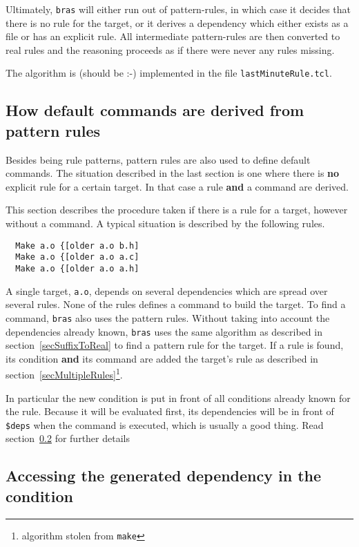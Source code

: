\documentclass[11pt]{scrartcl}
\newcommand{\bras}{\texttt{bras}}
\newcommand{\make}{\texttt{make}}
\begin{document}
Ultimately, \bras{} will either run out of pattern-rules, in which
case it decides that there is no rule for the target, or it derives a
dependency which either exists as a file or has an explicit rule. All
intermediate pattern-rules are then converted to real rules and the
reasoning proceeds as if there were never any rules missing.

The algorithm is (should be :-) implemented in the file
\texttt{lastMinuteRule.tcl}.

\subsection{How default commands are derived from pattern rules}
\label{secSuffixAsDefCmd}
Besides being rule patterns, pattern rules are also used to define
default commands. The situation described in the last section is one
where there is \textbf{no} explicit rule for a certain target. In that
case a rule \textbf{and} a command are derived.

This section describes the procedure taken if there is a rule for a
target, however without a command. A typical situation is described by
the following rules.

\begin{verbatim}
  Make a.o {[older a.o b.h]
  Make a.o {[older a.o a.c]
  Make a.o {[older a.o a.h]
\end{verbatim}

A single target, \texttt{a.o}, depends on several dependencies which
are spread over several rules. None of the rules defines a command to
build the target. To find a command, \bras{} also uses the pattern
rules. Without taking into account the dependencies already known,
\bras{} uses the same algorithm as described in
section~\ref{secSuffixToReal} to find a pattern rule for the target.
If a rule is found, its condition \textbf{and} its command are added
the target's rule as described in
section~\ref{secMultipleRules}\footnote{algorithm stolen from \make{}}.

In particular the new condition is put in front of all conditions
already known for the rule. Because it will be evaluated first, its
dependencies will be in front of \texttt{\$deps} when the command is
executed, which is usually a good thing. Read section~\ref{sec:depd}
for further details
\subsection{Accessing the generated dependency in the condition}
\label{sec:depd}
\end{document}
